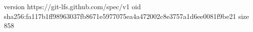 version https://git-lfs.github.com/spec/v1
oid sha256:fa117b1ff98963037fb8671e5977075ea4a472002c8e3757a1d6ee0081f9be21
size 858
